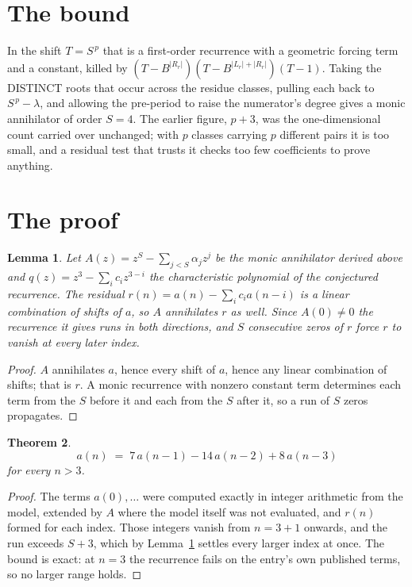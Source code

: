 \documentclass[11pt,a4paper]{article}
\theoremstyle{plain}
\newtheorem{theorem}{Theorem}
\newtheorem{lemma}[theorem]{Lemma}
\theoremstyle{definition}
\begin{document}
\section{The bound}

In the shift $T=S^{\,p}$ that is a first-order recurrence with a geometric forcing term and a
constant, killed by $(T-B^{|R_r|})(T-B^{|L_r|+|R_r|})(T-1)$. Taking the DISTINCT roots that
occur across the residue classes, pulling each back to $S^{\,p}-\lambda$, and allowing the
pre-period to raise the numerator's degree gives a monic annihilator of order $S=4$. The
earlier figure, $p+3$, was the one-dimensional count carried over unchanged; with $p$ classes
carrying $p$ different pairs it is too small, and a residual test that trusts it checks too few
coefficients to prove anything.

\section{The proof}

\begin{lemma}\label{lem:crit}
Let $A(z)=z^S-\sum_{j<S}\alpha_jz^{j}$ be the monic annihilator derived above and
$q(z)=z^{3}-\sum_ic_iz^{3-i}$ the characteristic polynomial of the conjectured
recurrence. The residual $r(n)=a(n)-\sum_ic_ia(n-i)$ is a linear combination of shifts of $a$,
so $A$ annihilates $r$ as well. Since $A(0)\ne0$ the recurrence it gives runs in both
directions, and $S$ consecutive zeros of $r$ force $r$ to vanish at every later index.
\end{lemma}

\begin{proof}
$A$ annihilates $a$, hence every shift of $a$, hence any linear combination of shifts; that is
$r$. A monic recurrence with nonzero constant term determines each term from the $S$ before it
and each from the $S$ after it, so a run of $S$ zeros propagates.
\end{proof}

\begin{theorem}
\[
a(n)\;=\;7\,a(n-1) - 14\,a(n-2) + 8\,a(n-3)
\]
for every $n>3$.
\end{theorem}

\begin{proof}
The terms $a(0),\dots$ were computed exactly in integer arithmetic from the model, extended by
$A$ where the model itself was not evaluated, and $r(n)$ formed for each index. Those integers
vanish from $n=3+1$ onwards, and the run exceeds $S+3$, which by
Lemma~\ref{lem:crit} settles every larger index at once. The bound is exact: at $n=3$ the recurrence fails on the entry's own published terms, so no larger range holds.
\end{proof}
\end{document}
